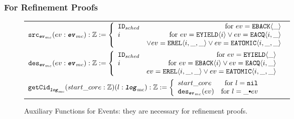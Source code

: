 \subsubsection{For Refinement Proofs}


\begin{figure}
\noindent{}

%
%

\begin{center}
\begin{tabular}{l}
$
\eventsourcefunckwd (ev : \mcevent) : \ztype := 
 \left\{\begin{array}{lr}
\schedid & \text{for } ev = \yieldbackev{\_} \\
i  & \text{for } ev =\yieldev{i}  \vee ev= \acqev{i}{\_} \\
   & \vee ev = \relev{i}{\_}{\_} \vee ev =  \atomicev{i}{\_}{\_}\\
\end{array} \right.
$\\
%
%
$
\eventdesfunckwd (ev : \mcevent) : \ztype := 
 \left\{\begin{array}{lr}
\schedid & \text{for } ev =\yieldev{\_} \\
i & \text{for } ev= \yieldbackev{i} \vee ev = \acqev{i}{\_}\\
   & ev=  \relev{i}{\_}{\_} \vee ev = \atomicev{i}{\_}{\_}\\
\end{array} \right.
$\\
%
%
$
\getcuridfromlogkwd (start\_core : \ztype) (l : \mclog): \ztype :=
 \left\{\begin{array}{lr}
start\_core & \text{for }  l = \nulllist \\
\eventdesfuncnoeq{ev} & \text{for } l = \listconsoppo{ev}{\_}\\
\end{array} \right.
$\\
\end{tabular}
\end{center}
\caption{Auxiliary Functions for Events: they are necessary for refinement proofs.}
\label{fig:chapter:conlink:auxiliary-functions-for-events-in-refinement}
\end{figure}

